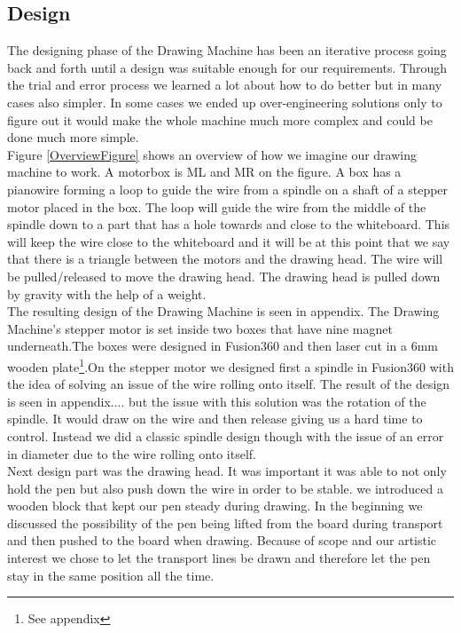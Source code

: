 \subsection{Design}
The designing phase of the Drawing Machine has been an iterative process going back and forth until a design was suitable enough for our requirements. Through the trial and error process we learned a lot about how to do better but in many cases also simpler. In some cases we ended up over-engineering solutions only to figure out it would make the whole machine much more complex and could be done much more simple.\\
Figure \ref{OverviewFigure} shows an overview of how we imagine our drawing machine to work. A motorbox is ML and MR on the figure. A box has a pianowire forming a loop to guide the wire from a spindle on a shaft of a stepper motor placed in the box. The loop will guide the wire from the middle of the spindle down to a part that has a hole towards and close to the whiteboard. This will keep the wire close to the whiteboard and it will be at this point that we say that there is a triangle between the motors and the drawing head. The wire will be pulled/released to move the drawing head. The drawing head is pulled down by gravity with the help of a weight.\\ The resulting design of the Drawing Machine is seen in appendix. The Drawing Machine's stepper motor is set inside two boxes that have nine magnet underneath.The boxes were designed in Fusion360 and then laser cut in a 6mm wooden plate\footnote{See appendix }.On the stepper motor we designed first a spindle in Fusion360 with the idea of solving an issue of the wire rolling onto itself. The result of the design is seen in appendix.... but the issue with this solution was the rotation of the spindle. It would draw on the wire and then release giving us a hard time to control. Instead we did a classic spindle design though with the issue of an error in diameter due to the wire rolling onto itself.\\
Next design part was the drawing head. It was important it was able to not only hold the pen but also push down the wire in order to be stable. we introduced a wooden block that kept our pen steady during drawing. In the beginning we discussed the possibility of the pen being lifted from the board during transport and then pushed to the board when drawing. Because of scope and our artistic interest we chose to let the transport lines be drawn and therefore let the pen stay in the same position all the time.  
